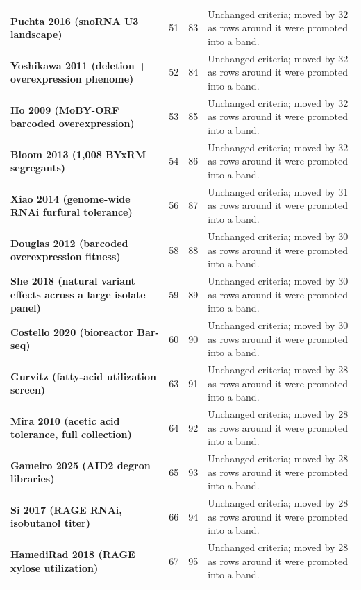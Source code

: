 \begin{longtable}{@{}L{46mm} r@{\hspace{6pt}} r@{\hspace{6pt}} L{104mm}@{}}
\addlinespace[5pt]
\textbf{Puchta 2016 (snoRNA U3 landscape)} & 51 & 83 & Unchanged criteria; moved by 32 as rows around it were promoted into a band. \\
\addlinespace[5pt]
\textbf{Yoshikawa 2011 (deletion + overexpression phenome)} & 52 & 84 & Unchanged criteria; moved by 32 as rows around it were promoted into a band. \\
\addlinespace[5pt]
\textbf{Ho 2009 (MoBY-ORF barcoded overexpression)} & 53 & 85 & Unchanged criteria; moved by 32 as rows around it were promoted into a band. \\
\addlinespace[5pt]
\textbf{Bloom 2013 (1,008 BYxRM segregants)} & 54 & 86 & Unchanged criteria; moved by 32 as rows around it were promoted into a band. \\
\addlinespace[5pt]
\textbf{Xiao 2014 (genome-wide RNAi furfural tolerance)} & 56 & 87 & Unchanged criteria; moved by 31 as rows around it were promoted into a band. \\
\addlinespace[5pt]
\textbf{Douglas 2012 (barcoded overexpression fitness)} & 58 & 88 & Unchanged criteria; moved by 30 as rows around it were promoted into a band. \\
\addlinespace[5pt]
\textbf{She 2018 (natural variant effects across a large isolate panel)} & 59 & 89 & Unchanged criteria; moved by 30 as rows around it were promoted into a band. \\
\addlinespace[5pt]
\textbf{Costello 2020 (bioreactor Bar-seq)} & 60 & 90 & Unchanged criteria; moved by 30 as rows around it were promoted into a band. \\
\addlinespace[5pt]
\textbf{Gurvitz (fatty-acid utilization screen)} & 63 & 91 & Unchanged criteria; moved by 28 as rows around it were promoted into a band. \\
\addlinespace[5pt]
\textbf{Mira 2010 (acetic acid tolerance, full collection)} & 64 & 92 & Unchanged criteria; moved by 28 as rows around it were promoted into a band. \\
\addlinespace[5pt]
\textbf{Gameiro 2025 (AID2 degron libraries)} & 65 & 93 & Unchanged criteria; moved by 28 as rows around it were promoted into a band. \\
\addlinespace[5pt]
\textbf{Si 2017 (RAGE RNAi, isobutanol titer)} & 66 & 94 & Unchanged criteria; moved by 28 as rows around it were promoted into a band. \\
\addlinespace[5pt]
\textbf{HamediRad 2018 (RAGE xylose utilization)} & 67 & 95 & Unchanged criteria; moved by 28 as rows around it were promoted into a band. \\

\end{longtable}

